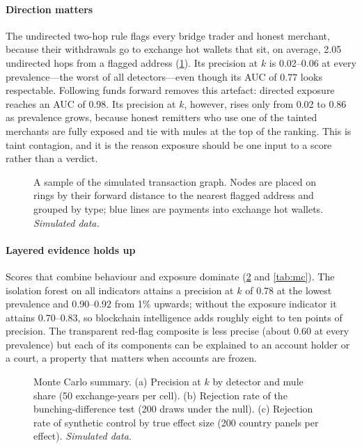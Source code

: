 \paragraph{Direction matters}
The undirected two-hop rule flags every bridge trader and honest merchant, because their withdrawals go to exchange hot
wallets that sit, on average, 2.05 undirected hops from a flagged address (\cref{fig:galaxy}). Its precision at $k$ is
0.02--0.06 at every prevalence---the worst of all detectors---even though its AUC of 0.77 looks respectable. Following
funds forward removes this artefact: directed exposure reaches an AUC of 0.98. Its precision at $k$, however, rises
only from 0.02 to 0.86 as prevalence grows, because honest remitters who use one of the tainted merchants are fully
exposed and tie with mules at the top of the ranking. This is taint contagion, and it is the reason exposure should be
one input to a score rather than a verdict.

\begin{figure}[!htbp]
\centering
{}
\caption{A sample of the simulated transaction graph. Nodes are placed on rings by their forward distance to the
nearest flagged address and grouped by type; blue lines are payments into exchange hot wallets. \emph{Simulated data.}}
\label{fig:galaxy}
\end{figure}

\paragraph{Layered evidence holds up}
Scores that combine behaviour and exposure dominate (\cref{fig:power} and \cref{tab:mc}). The isolation forest on all
indicators attains a precision at $k$ of 0.78 at the lowest prevalence and 0.90--0.92 from 1\% upwards; without the
exposure indicator it attains 0.70--0.83, so blockchain intelligence adds roughly eight to ten points of precision.
The transparent red-flag composite is less precise (about 0.60 at every prevalence) but each of its components can be
explained to an account holder or a court, a property that matters when accounts are frozen.

\begin{figure}[!htbp]
\centering
{}
\caption{Monte Carlo summary. (a) Precision at $k$ by detector and mule share (50 exchange-years per cell).
(b) Rejection rate of the bunching-difference test (200 draws under the null). (c) Rejection rate of synthetic control
by true effect size (200 country panels per effect). \emph{Simulated data.}}
\label{fig:power}
\end{figure}

